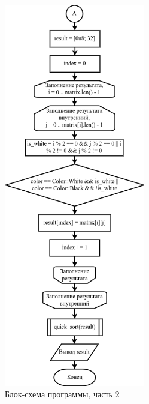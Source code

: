 \documentclass[14pt, a4paper]{extreport}
\begin{document}
\begin{figure}[H]
	\caption{Блок-схема программы, часть 2}
	\label{fig:scheme-main-part2}
	\includegraphics[width=0.55\textwidth]{scheme-main-part2}
\end{figure}
\end{document}
